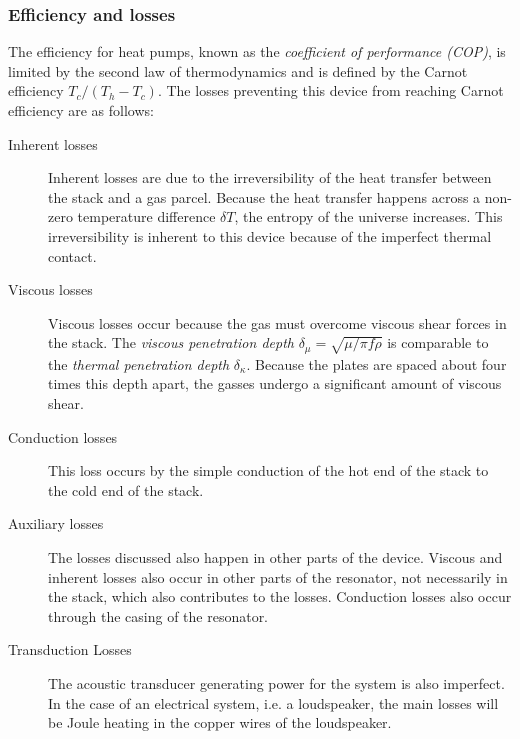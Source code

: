 \documentclass{article}
\begin{document}
\subsubsection{Efficiency and losses}
The efficiency for heat pumps, known as the \emph{coefficient of performance (COP)}, is limited by the second law of thermodynamics and is defined by the Carnot efficiency \(T_c/(T_h-T_c)\). The losses preventing this device from reaching Carnot efficiency are as follows:
\begin{description}
  \item[Inherent losses] Inherent losses are due to the irreversibility of the heat transfer between the stack and a gas parcel. Because the heat transfer happens across a non-zero temperature difference \(\delta T\), the entropy of the universe increases. This irreversibility is inherent to this device because of the imperfect thermal contact. %
  \item[Viscous losses] Viscous losses occur because the gas must overcome viscous shear forces in the stack. The \emph{viscous penetration depth} \(\delta_\mu=\sqrt{\mu / \pi f \rho} \) is comparable to the \emph{thermal penetration depth} \(\delta_\kappa\). Because the plates are spaced about four times this depth apart, the gasses undergo a significant amount of viscous shear.
  \item[Conduction losses] This loss occurs by the simple conduction of the hot end of the stack to the cold end of the stack.
  \item[Auxiliary losses] The losses discussed also happen in other parts of the device. Viscous and inherent losses also occur in other parts of the resonator, not necessarily in the stack, which also contributes to the losses. Conduction losses also occur through the casing of the resonator.
  \item[Transduction Losses] The acoustic transducer generating power for the system is also imperfect. In the case of an electrical system, i.e. a loudspeaker, the main losses will be Joule heating in the copper wires of the loudspeaker.
\end{description}
\end{document}
